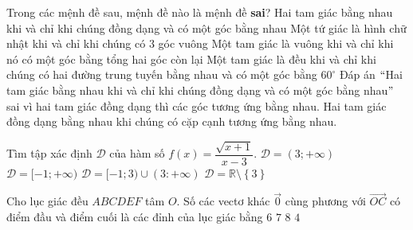 \begin{ex}%
Trong các mệnh đề sau, mệnh đề nào là mệnh đề \textbf{sai}?
\choice
{\True Hai tam giác bằng nhau khi và chỉ khi chúng đồng dạng và có một góc bằng nhau}
{Một tứ giác là hình chữ nhật khi và chỉ khi chúng có $3$ góc vuông     }
{Một tam giác là vuông khi và chỉ khi nó có một góc bằng tổng hai góc còn lại}
{Một tam giác là đều khi và chỉ khi chúng có hai đường trung tuyến bằng nhau và có một góc bằng $60^\circ $}
\loigiai
{
Đáp án $``$Hai tam giác bằng nhau khi và chỉ khi chúng đồng dạng và có một góc bằng nhau$"$ sai vì hai tam giác đồng dạng thì các góc tương ứng bằng nhau. Hai tam giác đồng dạng bằng nhau khi chúng có cặp cạnh tương ứng bằng nhau.
}
\end{ex}

\begin{ex}%
Tìm tập xác định $\mathscr{D}$ của hàm số $f(x)=\dfrac{\sqrt{x+1}}{x-3}$.
\choice
{$\mathscr{D}=(3;+\infty)$}
{$\mathscr{D}=[-1;+\infty)$}
{\True $\mathscr{D}=[-1;3)\cup (3:+\infty)$}
{$\mathscr{D}=\mathbb{R}\setminus \left\{3\right\}$}
\loigiai{Hàm số $f(x)=\dfrac{\sqrt{x+1}}{x-3}$ xác định khi $\heva{&x+1 \geq 0 \\&x-3 \neq 0}\Leftrightarrow \heva{&x\geq -1 \\&x \neq 3.} $\\
Vậy tập xác định của hàm số đã cho là $\mathscr{D}=[-1;3)\cup (3:+\infty)$.
}
\end{ex}

\begin{ex}%
Cho lục giác đều $ABCDEF$ tâm $O$. Số các vectơ khác $\overrightarrow{0}$ cùng phương với $\overrightarrow{OC}$ có điểm đầu và điểm cuối là các đỉnh của lục giác bằng
\choice
{\True $6$}
{$7$}
{$8$}
{$4$}
\end{ex}

